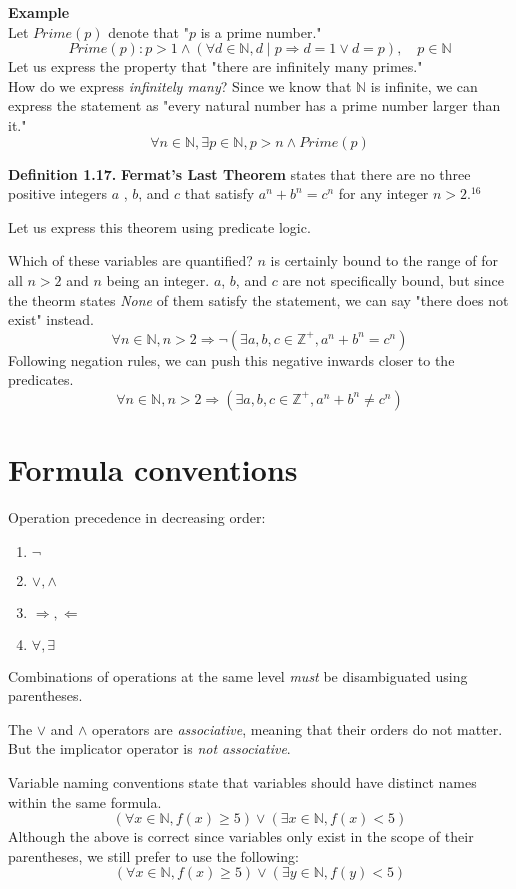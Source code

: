 \documentclass{article}
\begin{document}
\textbf{Example} \\
Let $Prime(p)$ denote that "$p$ is a prime number."
$$Prime(p) : p > 1 \land (\forall d \in \mathbb{N}, d \mid p \Rightarrow 
d = 1 \lor d = p), \quad p \in \mathbb{N}$$
Let us express the property that "there are infinitely many primes." \\
How do we express \textit{infinitely many}? Since we know that $ \mathbb{N}$ is
infinite, we can express the statement as "every natural number has a prime 
number larger than it."
$$\forall n \in \mathbb{N}, \exists p \in \mathbb{N}, p > n \land Prime(p)$$

\textbf{Definition 1.17.} \textbf{Fermat's Last Theorem} states that there are 
no three positive integers $a$ , $b$, and $c$ that satisfy $a^n + b^n = c^n$ for 
any integer $n > 2$.$^{16}$

Let us express this theorem using predicate logic. 

\newpage
Which of these variables are quantified? $n$ is certainly bound to the range of 
for all $n > 2$ and $n$ being an integer. $a$, $b$, and $c$ are not specifically 
bound, but since the theorm states \textit{None} of them satisfy the statement, 
we can say "there does not exist" instead.
$$\forall n \in \mathbb{N}, n > 2 \Rightarrow \neg (\exists a, b, c \in 
\mathbb{Z}^+, a^n + b^n = c^n )$$
Following negation rules, we can push this negative inwards closer to the predicates.
$$\forall n \in \mathbb{N}, n > 2 \Rightarrow (\exists a, b, c \in 
\mathbb{Z}^+, a^n + b^n \ne c^n)$$

\section{Formula conventions}
Operation precedence in decreasing order:
\begin{center}
\begin{enumerate}
    \item $\neg$
    \item $\lor, \land$
    \item $\Rightarrow, \Leftarrow$
    \item $\forall, \exists$
\end{enumerate}
\end{center}
Combinations of operations at the same level \textit{must} be disambiguated 
using parentheses. 

The $\lor$ and $\land$ operators are \textit{associative}, meaning that their 
orders do not matter. But the implicator operator is \textit{not associative}. 

Variable naming conventions state that variables should have distinct names 
within the same formula.
$$(\forall x \in \mathbb{N}, f(x) \geq 5) \lor (\exists x \in \mathbb{N}, f(x) < 5)$$
Although the above is correct since variables only exist in the scope of their 
parentheses, we still prefer to use the following:
$$(\forall x \in \mathbb{N}, f(x) \geq 5) \lor (\exists y \in \mathbb{N}, f(y) < 5)$$
\end{document}
